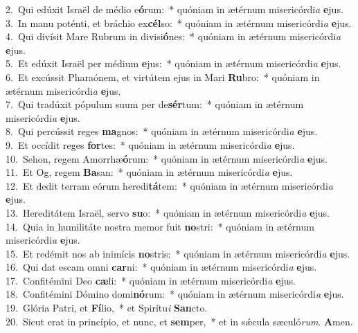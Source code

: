 {2.~}Qui edúxit Israël de médio e\textbf{ó}rum:~* quóniam in ætérnum misericórdi\textit{a} \textbf{e}jus.\\
{3.~}In manu poténti, et bráchio ex\textbf{cél}so:~* quóniam in ætérnum misericórdi\textit{a} \textbf{e}jus.\\
{4.~}Qui divísit Mare Rubrum in divisi\textbf{ó}nes:~* quóniam in ætérnum misericórdi\textit{a} \textbf{e}jus.\\
{5.~}Et edúxit Israël per médium \textbf{e}jus:~* quóniam in ætérnum misericórdi\textit{a} \textbf{e}jus.\\
{6.~}Et excússit Pharaónem, et virtútem ejus in Mari \textbf{Ru}bro:~* quóniam in ætérnum misericórdi\textit{a} \textbf{e}jus.\\
{7.~}Qui tradúxit pópulum suum per de\textbf{sér}tum:~* quóniam in ætérnum misericórdi\textit{a} \textbf{e}jus.\\
{8.~}Qui percússit reges \textbf{ma}gnos:~* quóniam in ætérnum misericórdi\textit{a} \textbf{e}jus.\\
{9.~}Et occídit reges \textbf{for}tes:~* quóniam in ætérnum misericórdi\textit{a} \textbf{e}jus.\\
{10.~}Sehon, regem Amorrhæ\textbf{ó}rum:~* quóniam in ætérnum misericórdi\textit{a} \textbf{e}jus.\\
{11.~}Et Og, regem \textbf{Ba}san:~* quóniam in ætérnum misericórdi\textit{a} \textbf{e}jus.\\
{12.~}Et dedit terram eórum heredi\textbf{tá}tem:~* quóniam in ætérnum misericórdi\textit{a} \textbf{e}jus.\\
{13.~}Hereditátem Israël, servo \textbf{su}o:~* quóniam in ætérnum misericórdi\textit{a} \textbf{e}jus.\\
{14.~}Quia in humilitáte nostra memor fuit \textbf{no}stri:~* quóniam in ætérnum misericórdi\textit{a} \textbf{e}jus.\\
{15.~}Et redémit nos ab inimícis \textbf{no}stris:~* quóniam in ætérnum misericórdi\textit{a} \textbf{e}jus.\\
{16.~}Qui dat escam omni \textbf{car}ni:~* quóniam in ætérnum misericórdi\textit{a} \textbf{e}jus.\\
{17.~}Confitémini Deo \textbf{cæ}li:~* quóniam in ætérnum misericórdi\textit{a} \textbf{e}jus.\\
{18.~}Confitémini Dómino domi\textbf{nó}rum:~* quóniam in ætérnum misericórdi\textit{a} \textbf{e}jus.\\
{19.~}Glória Patri, et \textbf{Fí}lio,~* et Spirítu\textit{i} \textbf{San}cto.\\
{20.~}Sicut erat in princípio, et nunc, et \textbf{sem}per,~* et in sǽcula sæculó\textit{rum}. \textbf{A}men.\\
